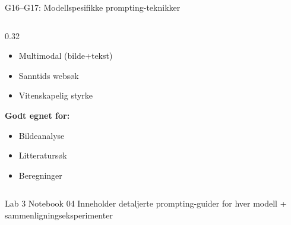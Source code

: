 \documentclass[aspectratio=169, 10pt]{beamer}
\begin{document}
\begin{frame}{G16--G17: Modellspesifikke prompting-teknikker}
\begin{columns}[T]
\begin{column}{0.32\textwidth}
            \begin{itemize}
                \item Multimodal (bilde+tekst)
                \item Sanntids websøk
                \item Vitenskapelig styrke
            \end{itemize}
            \textbf{Godt egnet for:}
            \begin{itemize}
                \item Bildeanalyse
                \item Litteratursøk
                \item Beregninger
            \end{itemize}
        \end{column}
    \end{columns}
    
    \vspace{0.15cm}
    \begin{block}{\footnotesize Lab 3 Notebook 04}
        \footnotesize Inneholder detaljerte prompting-guider for hver modell + sammenligningseksperimenter
    \end{block}
\end{frame}
\end{document}
